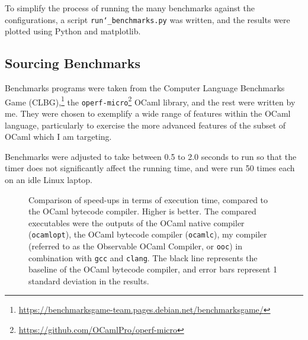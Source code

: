 To simplify the process of running the many benchmarks against the
configurations, a script \texttt{run\char`_benchmarks.py} was written, and the
results were plotted using Python and matplotlib.

\subsection{Sourcing Benchmarks}

Benchmarks programs were taken from the Computer Language Benchmarks Game
(CLBG),\footnote{\url{https://benchmarksgame-team.pages.debian.net/benchmarksgame/}}
the \texttt{operf-micro}\footnote{\url{https://github.com/OCamlPro/operf-micro}}
OCaml library, and the rest were written by me.  They were chosen to exemplify a
wide range of features within the OCaml language, particularly to exercise the
more advanced features of the subset of OCaml which I am targeting.

Benchmarks were adjusted to take between 0.5 to 2.0 seconds to run so that the
timer does not significantly affect the running time, and were run 50 times each
on an idle Linux laptop.

\begin{figure}
    \centering

    \caption{
    Comparison of speed-ups in terms of execution time, compared to the OCaml
    bytecode compiler. Higher is better. The compared executables were the
    outputs of the OCaml native compiler (\texttt{ocamlopt}), the OCaml bytecode
    compiler (\texttt{ocamlc}), my compiler (referred to as the Observable OCaml
    Compiler, or \texttt{ooc}) in combination with \texttt{gcc} and
    \texttt{clang}. The black line represents the baseline of the OCaml bytecode
    compiler, and error bars represent 1 standard deviation in the results.
    }\label{fig:raw-benchmarks}
\end{figure}

